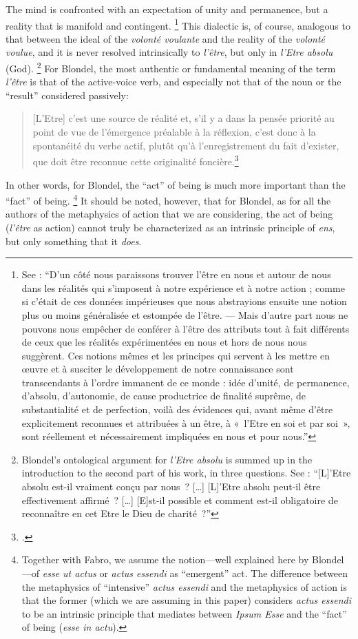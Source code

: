 %
The mind is confronted with an expectation of unity and permanence, but a reality that is manifold and contingent.%
%
\footnote{See \cite[67–68]{blondel:action}: “D’un côté nous paraissons trouver l’être en nous et autour de nous dans les réalités qui s’imposent à notre expérience et à notre action ; comme si c’était de ces données impérieuses que nous abstrayions ensuite une notion plus ou moins généralisée et estompée de l’être. — Mais d’autre part nous ne pouvons nous empêcher de conférer à l’être des attributs tout à fait différents de ceux que les réalités expérimentées en nous et hors de nous nous suggèrent. Ces notions mêmes et les principes qui servent à les mettre en œuvre et à susciter le développement de notre connaissance sont transcendants à l’ordre immanent de ce monde : idée d’unité, de permanence, d’absolu, d’autonomie, de cause productrice de finalité suprême, de substantialité et de perfection, voilà des évidences qui, avant même d’être explicitement reconnues et attribuées à un être, à «~l’Etre en soi et par soi~», sont réellement et nécessairement impliquées en nous et pour nous.”}
%
This dialectic is, of course, analogous to that between the ideal of the \emph{volonté voulante} and the reality of the \emph{volonté voulue}, and it is never resolved intrinsically to \emph{l’être}, but only in \emph{l’Etre absolu} (God).%
%
\footnote{Blondel’s ontological argument for \emph{l’Etre absolu} is summed up in the introduction to the second part of his work, in three questions. See \cite[149]{blondel:action}: “[L]’Etre absolu est-il vraiment conçu par nous~? [\ldots] [L]’Etre absolu peut-il être effectivement affirmé~? [\ldots] [E]st-il possible et comment est-il obligatoire de reconnaître en cet Etre le Dieu de charité~?”}
%
For Blondel, the most authentic or fundamental meaning of the term \emph{l’être} is that of the active-voice verb, and especially not that of the noun or the “result” considered passively:
%
\begin{quotation}
[L’Etre] c’est une source de réalité et, s’il y a dans la pensée priorité au point de vue de l’émergence préalable à la réflexion, c’est donc à la spontanéité du verbe actif, plutôt qu’à l’enregistrement du fait d’exister, que doit être reconnue cette originalité foncière.\footcite[48–49]{blondel:etre}
\end{quotation}
%
In other words, for Blondel, the “act” of being is much more important than the “fact” of being.%
%
\footnote{Together with Fabro, we assume the notion—well explained here by Blondel—of \emph{esse ut actus} or \emph{actus essendi} as “emergent” act. The difference between the metaphysics of “intensive” \emph{actus essendi} and the metaphysics of action is that the former (which we are assuming in this paper) considers \emph{actus essendi} to be an intrinsic principle that mediates between \emph{Ipsum Esse} and the “fact” of being (\emph{esse in actu}).}
%
It should be noted, however, that for Blondel, as for all the authors of the metaphysics of action that we are considering, the act of being (\emph{l’être} as action) cannot truly be characterized as an intrinsic principle of \emph{ens}, but only something that it \emph{does}.

